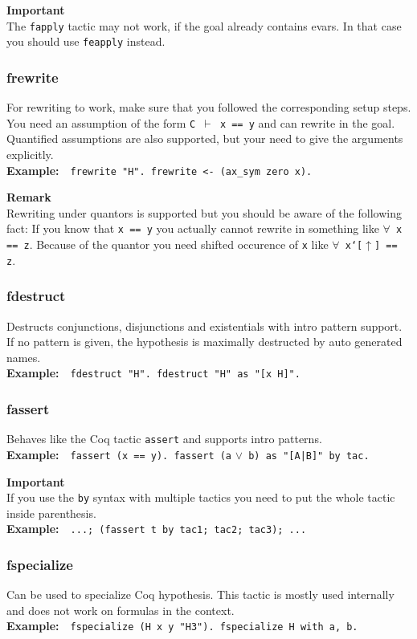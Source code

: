 \documentclass[12pt, a4paper]{article}
\newcommand{\coq}[1]{\texttt{#1}}
\newcommand{\important}[1]{
	\vspace{3pt}
	\begin{boximportant}
		\parbox{\textwidth}{\textcolor{colorimportant}{\textbf{Important}\\#1}}
	\end{boximportant}}
\newcommand{\remark}[1]{
	\vspace{3pt}
	\begin{boxremark}
		\parbox{\textwidth}{\textbf{Remark}\\#1}
	\end{boxremark}}
\newcommand{\example}[1]{\medskip\\\textbf{Example:}~~#1}
\begin{document}
\important{The \texttt{fapply} tactic may not work, if the goal already contains evars. In that case you should use \texttt{feapply} instead.}



\subsubsection{\ttfamily frewrite}

For rewriting to work, make sure that you followed the corresponding setup steps.
You need an assumption of the form \texttt{C $\vdash$ x == y} and can rewrite in the goal.
Quantified assumptions are also supported, but your need to give the arguments explicitly.
\example{\coq{frewrite "H". frewrite <- (ax_sym zero x).}}

\remark{Rewriting under quantors is supported but you should be aware of the following fact: If you know that \coq{x == y} you actually cannot rewrite in something like \texttt{$\forall$~\coq{x == z}}. Because of the quantor you need shifted occurence of \coq{x} like \texttt{$\forall$~\coq{x`[}$\uparrow$\coq{] == z}}.}


\subsubsection{\ttfamily fdestruct}

Destructs conjunctions, disjunctions and existentials with intro pattern support. 
If no pattern is given, the hypothesis is maximally destructed by auto generated names.
\example{\coq{fdestruct "H". fdestruct "H" as "[x H]".}}


\subsubsection{\ttfamily fassert}

Behaves like the Coq tactic \texttt{assert} and supports intro patterns.
\example{\coq{fassert (x == y). fassert (a} $\lor$\coq{ b) as "[A|B]" by tac.}}

\important{If you use the \texttt{by} syntax with multiple tactics you need to put the whole tactic inside parenthesis. \example{\texttt{...; (fassert t by tac1; tac2; tac3); ...}}}


\subsubsection{\ttfamily fspecialize}

Can be used to specialize Coq hypothesis.
This tactic is mostly used internally and does not work on formulas in the context.
\example{\coq{fspecialize (H x y "H3"). fspecialize H with a, b.}}
\end{document}
